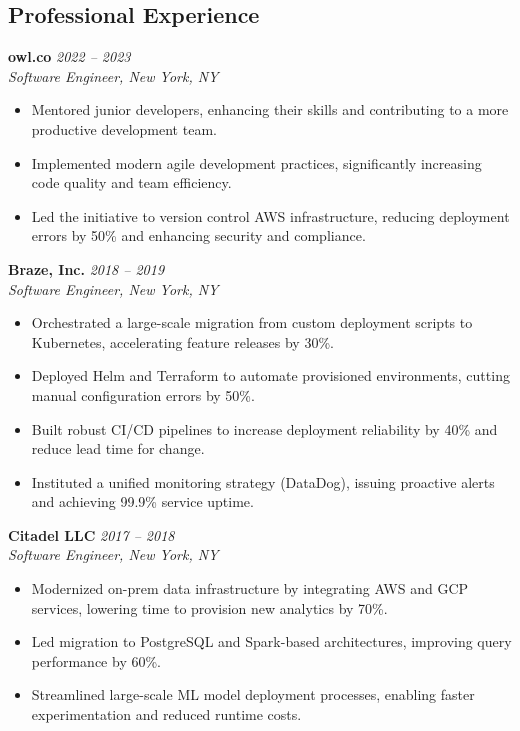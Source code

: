 \documentclass[margin,line]{resume}
\begin{document}
\begin{resume}
\vspace{10pt}

\section{Professional Experience}

\filbreak
\textbf{owl.co} \hfill \textit{2022 -- 2023}\\
\textit{Software Engineer, New York, NY}

\begin{itemize}
    \item Mentored junior developers, enhancing their skills and contributing to a more productive development team.
    \item Implemented modern agile development practices, significantly increasing code quality and team efficiency.
    \item Led the initiative to version control AWS infrastructure, reducing deployment errors by 50\% and enhancing security and compliance.
\end{itemize}

\filbreak
\textbf{Braze, Inc.} \hfill \textit{2018 -- 2019}\\
\textit{Software Engineer, New York, NY}

\begin{itemize}
    \item Orchestrated a large-scale migration from custom deployment scripts to Kubernetes, accelerating feature releases by 30\%.
    \item Deployed Helm and Terraform to automate provisioned environments, cutting manual configuration errors by 50\%.
    \item Built robust CI/CD pipelines to increase deployment reliability by 40\% and reduce lead time for change.
    \item Instituted a unified monitoring strategy (DataDog), issuing proactive alerts and achieving 99.9\% service uptime.
\end{itemize}

\filbreak
\textbf{Citadel LLC} \hfill \textit{2017 -- 2018}\\
\textit{Software Engineer, New York, NY}

\begin{itemize}
    \item Modernized on-prem data infrastructure by integrating AWS and GCP services, lowering time to provision new analytics by 70\%.
    \item Led migration to PostgreSQL and Spark-based architectures, improving query performance by 60\%.
    \item Streamlined large-scale ML model deployment processes, enabling faster experimentation and reduced runtime costs.
\end{itemize}


\end{resume}
\end{document}
